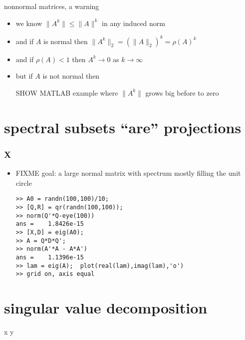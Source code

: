 \documentclass[10pt,hyperref]{beamer}
\begin{document}
\begin{frame}{nonnormal matrices, a warning}

\begin{itemize}
\item we know $\|A^k\|\le \|A\|^k$ in any induced norm
\item and if $A$ is normal then $\|A^k\|_2 = (\|A\|_2)^k = \rho(A)^k$
\item and if $\rho(A)<1$ then $A^k \to 0$ as $k\to \infty$
\item but if $A$ is not normal then

SHOW MATLAB example where $\|A^k\|$ grows big before to zero
\end{itemize}
\end{frame}



\section{spectral subsets ``are'' projections}

\begin{frame}[fragile]
\frametitle{X}

\begin{itemize}
\item FIXME  goal: a large normal matrix with spectrum mostly filling the unit circle

\begin{Verbatim}[fontsize=\scriptsize]
>> A0 = randn(100,100)/10;
>> [Q,R] = qr(randn(100,100));
>> norm(Q'*Q-eye(100))
ans =    1.8426e-15
>> [X,D] = eig(A0);
>> A = Q*D*Q';
>> norm(A'*A - A*A')
ans =    1.1396e-15
>> lam = eig(A);  plot(real(lam),imag(lam),'o')
>> grid on, axis equal
\end{Verbatim}

\end{itemize}
\end{frame}


\section{singular value decomposition}

\begin{frame}{x}
y
\end{frame}
\end{document}
